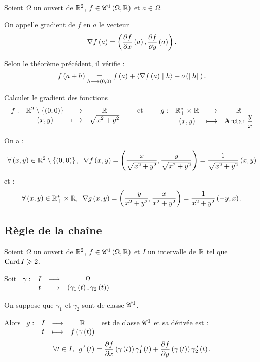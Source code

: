 \begin{defi}[Gradient]
Soient \(\Omega\) un ouvert de \(\mathbb{R}^2\), \(f\in\mathscr{C}^{1}\left(\Omega,\mathbb{R}\right)\) et \(a\in\Omega\).

On appelle gradient de \(f\) en \(a\) le vecteur \[\nabla f\left(a\right)=\left(\pdv{f}{x}\left(a\right),\pdv{f}{y}\left(a\right)\right).\]

Selon le théorème précédent, il vérifie : \[f\left(a+h\right)\underset{h\longrightarrow\left(0,0\right)}{=}f\left(a\right)+\left\langle\nabla f\left(a\right)\;\middle|\; h\right\rangle+o\left(\left\|h\right\|\right).\]
\end{defi}

\begin{exoex}
Calculer le gradient des fonctions \[\begin{array}[t]{cccc}f : & \mathbb{R}^2\setminus\left\lbrace\left(0,0\right)\right\rbrace & \longrightarrow & \mathbb{R} \\ & \left(x,y\right) & \longmapsto & \sqrt{x^2+y^2}\end{array}\qquad\text{et}\qquad\begin{array}[t]{cccc}g : & \mathbb{R}_+^*\times\mathbb{R} & \longrightarrow & \mathbb{R} \\ & \left(x,y\right) & \longmapsto & \operatorname{Arctan}\dfrac{y}{x}\end{array}\]
\end{exoex}

\begin{corr}
On a : \[\quantifs{\forall\paren{x,y}\in\R^2\excluant\accol{\paren{0,0}}}\nabla f\paren{x,y}=\paren{\dfrac{x}{\sqrt{x^2+y^2}},\dfrac{y}{\sqrt{x^2+y^2}}}=\dfrac{1}{\sqrt{x^2+y^2}}\paren{x,y}\] et : \[\quantifs{\forall\paren{x,y}\in\Rps\times\R}\nabla g\paren{x,y}=\paren{\dfrac{-y}{x^2+y^2},\dfrac{x}{x^2+y^2}}=\dfrac{1}{x^2+y^2}\paren{-y,x}.\]
\end{corr}

\subsection{Règle de la chaîne}

\begin{prop}
Soient \(\Omega\) un ouvert de \(\mathbb{R}^2\), \(f\in\mathscr{C}^{1}\left(\Omega,\mathbb{R}\right)\) et \(I\) un intervalle de \(\mathbb{R}\) tel que \(\operatorname{Card} I\geqslant2\).

Soit \(\begin{array}[t]{cccc}\gamma : & I & \longrightarrow & \Omega \\ & t & \longmapsto & \left(\gamma_1\left(t\right),\gamma_2\left(t\right)\right)\end{array}\)

On suppose que \(\gamma_1\) et \(\gamma_2\) sont de classe \(\mathscr{C}^{1}\).

Alors \(\begin{array}[t]{cccc}g : & I & \longrightarrow & \mathbb{R} \\ & t & \longmapsto & f\left(\gamma\left(t\right)\right)\end{array}\) est de classe \(\mathscr{C}^{1}\) et sa dérivée est : \[\quantifs{\forall t\in I}g\prim\paren{t}=\pdv{f}{x}\paren{\gamma\paren{t}}\gamma_1\prim\paren{t}+\pdv{f}{y}\paren{\gamma\paren{t}}\gamma_2\prim\paren{t}.\]
\end{prop}

